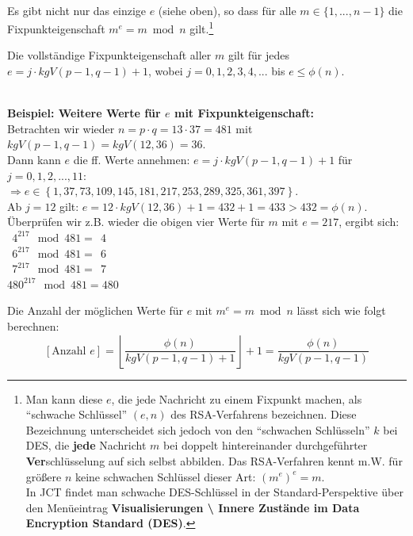 \begin{refsegment}
~\\ %
 Es gibt nicht nur das einzige $e$ (siehe oben), so dass für alle $ m \in \{1,...,n-1\}$ die Fixpunkteigenschaft $ m^e = m \bmod n$ gilt.\footnote{%
  Man kann diese $e$, die jede Nachricht zu einem Fixpunkt machen, als
  "`schwache Schlüssel"' $(e,n)$ des RSA-Verfahrens
  bezeichnen.
  Diese Bezeichnung unterscheidet sich jedoch von den "`schwachen Schlüsseln"'
  $k$ bei DES, die \textbf{jede} Nachricht $m$ bei doppelt
  hintereinander durchgeführter \textbf{Ver}schlüsselung auf sich selbst
  abbilden.
  Das RSA-Verfahren kennt m.W. für größere $n$ keine schwachen Schlüssel
  dieser Art: $(m^e)^e = m$.\\
  In JCT findet man schwache DES-Schlüssel in der
  Standard-Perspektive über den Menüeintrag \textbf{Visualisierungen
  \textbackslash{} Innere Zustände im Data Encryption Standard (DES)}.
}

\begin{satz}\label{nt-thm-complete-fixed-point-property-values-of-e}
Die vollständige Fixpunkteigenschaft aller $m$ gilt für jedes\\
$e=j\cdot kgV(p-1,q-1)+1$, wobei $j=0,1,2,3,4, ... $ bis $e \leq \phi(n)$.
\end{satz}

~\\ %
\textbf{Beispiel: Weitere Werte für $e$ mit Fixpunkteigenschaft:}\\
Betrachten wir wieder
$n=p\cdot q= 13\cdot 37=481$ mit $kgV(p-1,q-1)=kgV(12,36)=36$.\\
Dann kann $e$ die ff. Werte annehmen: $e=j\cdot kgV(p-1,q-1)+1$ für $j=0,1,2,...,11$:\\
$\Rightarrow e \in \left\{ 1, 37,73,109,145,181,217, 253, 289, 325, 361,397\right\}$.\\

 Ab $j=12$ gilt: $ e=12\cdot kgV(12,36)+1=432+1=433 > 432=\phi(n)$.\\

 Überprüfen wir z.B. wieder die obigen vier Werte für $m$ mit $e=217$, ergibt sich:\\
$~~4^{217} \mod 481=~~4 $\\
$~~6^{217} \mod 481=~~6 $\\
$~~7^{217} \mod 481=~~7 $\\
$480^{217} \mod 481=480 $\\

\begin{satz}\label{nt-thm-complete-fixed-point-property-number-of-e}
Die Anzahl der möglichen Werte für $e\text{ mit } m^e = m \bmod n$ lässt sich wie folgt berechnen:
\[\left[ \text{Anzahl }e \right]=\left\lfloor \frac{\phi(n)}{kgV(p-1,q-1)+1}\right\rfloor +1=\frac{\phi(n)}{kgV(p-1,q-1)}
\]
\end{satz}


\end{refsegment}
